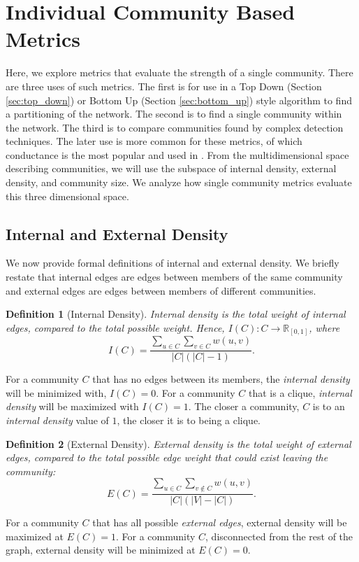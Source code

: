 \documentclass[phd,tocprelim]{cornell}
\newtheorem{definition}{Definition}
\begin{document}
\section{Individual Community Based Metrics}

Here, we explore metrics that evaluate the strength of a single community.  There are three uses of such metrics.  The first is for use in a Top Down (Section \ref{sec:top_down}) or Bottom Up (Section \ref{sec:bottom_up}) style algorithm to find a partitioning of the network.  The second is to find a single community within the network.  The third is to compare communities found by complex detection techniques.  The later use is more common for these metrics, of which conductance is the most popular and used in \cite{JTODO}.  From the multidimensional space describing communities, we will use the subspace of internal density, external density, and community size.  We analyze how single community metrics evaluate this three dimensional space.


\subsection{Internal and External Density}

We now provide formal definitions of internal and external density.  We briefly restate that internal edges are edges between members of the same community and external edges are edges between members of different communities.
\begin{definition}[Internal Density]
\label{def:int_density_single}
Internal density is the total weight of internal edges, compared to the total possible weight.  Hence, $I(C) : C \rightarrow \mathbb{R}_{[0, 1]}$, where
\begin{equation}
 I(C) =\frac{\sum_{u \in C} \sum_{v \in C} w(u,v)}{|C|(|C| - 1)} .
\end{equation}
\label{def_int_density}
\end{definition}
For a community $C$ that has no edges between its members, the {\it internal density} will be minimized with, $I(C) = 0$.  For a community $C$ that is a clique, {\it internal density} will be maximized with $I(C) = 1$.  The closer a community, $C$ is to an {\it internal density} value of $1$, the closer it is to being a clique.  
\begin{definition}[External Density]
\label{def:ext_density_single}
External density is the total weight of external edges, compared to the total possible edge weight that could exist leaving the community:
\begin{equation}
 E(C) = \frac{\sum_{u \in C} \sum_{v \notin C} w(u,v)}{|C|(|V| - |C|)}.
\end{equation}
\label{def_ext_density}
\end{definition}
For a community $C$ that has all possible {\it external edges}, external density will be maximized at $E(C)=1$.  For a community $C$, disconnected from the rest of the graph, external density will be minimized at $E(C) = 0$.
\end{document}
